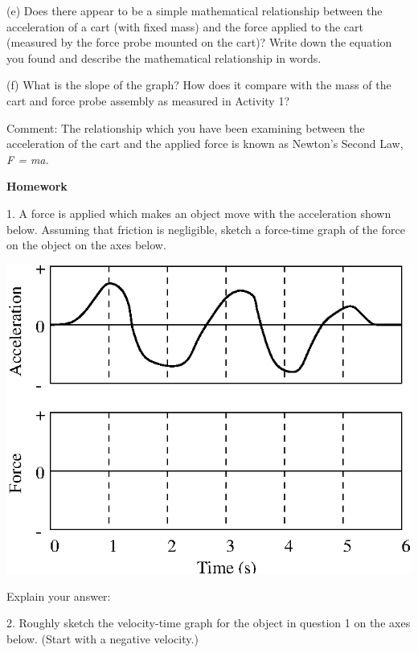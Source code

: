 (e) Does there appear to be a simple mathematical relationship between the acceleration of a cart (with fixed mass) and the force applied to the cart (measured by the force probe mounted on the cart)? Write down the equation you found and describe the mathematical relationship in words.
\vspace{20mm}

(f) What is the slope of the graph?  How does it compare with the mass of the cart and force probe assembly as measured in Activity 1?
\vspace{20mm}

Comment: The relationship which you have been examining between the acceleration of the cart and the applied force is known as Newton's Second Law, \textit{F = ma.}
\newpage

\textbf{Homework} 

1. A force is applied which makes an object move with the acceleration shown
below. Assuming that friction is negligible, sketch a force-time graph of the
force on the object on the axes below.

\vspace{0.3cm}
{\par\centering \includegraphics{force1_fig6.eps} \par}
\vspace{0.3cm}

Explain your answer:
\vspace{10mm}

2. Roughly sketch the velocity-time graph for the object in question 1 on the
axes below. (Start with a negative velocity.)

